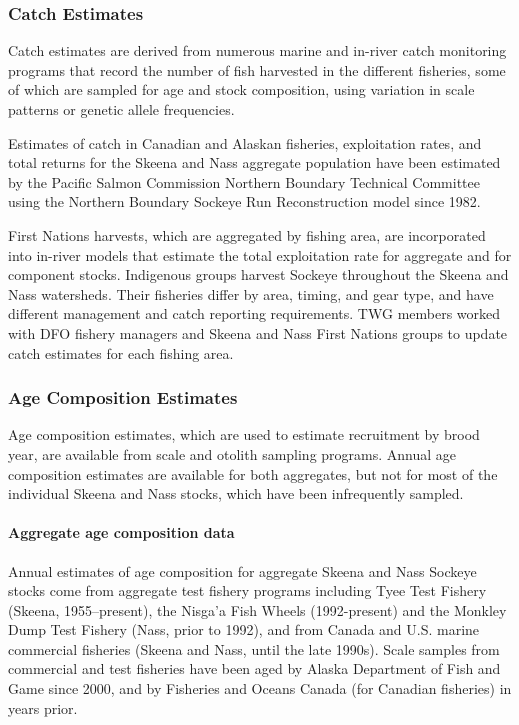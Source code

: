 \documentclass[french,11pt]{book}
\begin{document}
\subsubsection{Catch Estimates}\label{catch-estimates}

Catch estimates are derived from numerous marine and in-river catch monitoring programs that record the number of fish harvested in the different fisheries, some of which are sampled for age and stock composition, using variation in scale patterns or genetic allele frequencies.

Estimates of catch in Canadian and Alaskan fisheries, exploitation rates, and total returns for the Skeena and Nass aggregate population have been estimated by the Pacific Salmon Commission Northern Boundary Technical Committee using the Northern Boundary Sockeye Run Reconstruction model since 1982.

First Nations harvests, which are aggregated by fishing area, are incorporated into in-river models that estimate the total exploitation rate for aggregate and for component stocks. Indigenous groups harvest Sockeye throughout the Skeena and Nass watersheds. Their fisheries differ by area, timing, and gear type, and have different management and catch reporting requirements. TWG members worked with DFO fishery managers and Skeena and Nass First Nations groups to update catch estimates for each fishing area.

\subsubsection{Age Composition Estimates}\label{age-composition-estimates}

Age composition estimates, which are used to estimate recruitment by brood year, are available from scale and otolith sampling programs. Annual age composition estimates are available for both aggregates, but not for most of the individual Skeena and Nass stocks, which have been infrequently sampled.

\paragraph{Aggregate age composition data}\label{aggregate-age-composition-data}

Annual estimates of age composition for aggregate Skeena and Nass Sockeye stocks come from aggregate test fishery programs including Tyee Test Fishery (Skeena, 1955--present), the Nisga'a Fish Wheels (1992-present) and the Monkley Dump Test Fishery (Nass, prior to 1992), and from Canada and U.S. marine commercial fisheries (Skeena and Nass, until the late 1990s). Scale samples from commercial and test fisheries have been aged by Alaska Department of Fish and Game since 2000, and by Fisheries and Oceans Canada (for Canadian fisheries) in years prior.
\end{document}
